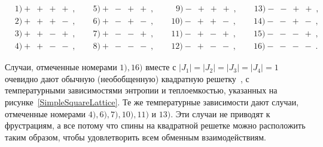 \documentclass[utf8,12pt]{jetp}
\begin{document}
\begin{align*}
 	&1) +\;+\;+\;+\;, \qquad   5) +\;-\;+\;+\;, \qquad	 \;\;9) -\;+\;+\;+\;, \qquad	 13) -\;-\;+\;+\;, \\
	&2) +\;+\;+\;-\;, \qquad  6) +\;-\;+\;-\;, \qquad	 10) -\;+\;+\;-\;, \qquad	 14) -\;-\;+\;-\;, \\
	&3) +\;+\;-\;+\;, \qquad  7) +\;-\;-\;+\;, \qquad  11) -\;+\;-\;+\;, \qquad	 15) -\;-\;-\;+\;, \\
	&4) +\;+\;-\;-\;, \qquad  8) +\;-\;-\;-\;, \qquad	 12) -\;+\;-\;-\;, \qquad	 16) -\;-\;-\;-\;.
\end{align*}

Случаи, отмеченные номерами $1), 16)$ вместе с $|J_1| = |J_2| = |J_3| = |J_4| = 1$ очевидно дают обычную (необобщенную) квадратную решетку~\cite{onsager1941}, с температурными зависимостями энтропии и теплоемкостью, указанных на рисунке~\ref{SimpleSquareLattice}. Те же температурные зависимости дают случаи, отмеченные номерами $4), 6), 7), 10), 11)$ и $13)$. Эти случаи не приводят к фрустрациям, а все потому что спины на квадратной решетке можно расположить таким образом, чтобы удовлетворить всем обменным взаимодействиям.
\end{document}
